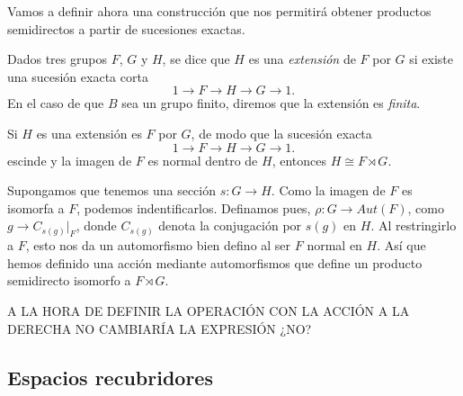 \documentclass[TFG.tex]{subfiles}
\begin{document}
Vamos a definir ahora una construcción que nos permitirá obtener productos semidirectos a partir de sucesiones exactas.

\begin{defi}
Dados tres grupos $F$, $G$ y $H$, se dice que $H$ es una \emph{extensión} de $F$ por $G$ si existe una sucesión exacta corta
\[
1\to F\to H\to G\to 1.
\]
En el caso de que $B$ sea un grupo finito, diremos que la extensión es \emph{finita}.
\end{defi} 

\begin{prop}\label{semidirect}
Si $H$ es una extensión es $F$ por $G$, de modo que la sucesión exacta 
\[
1\to F\to H\to G\to 1.
\]
escinde y la imagen de $F$ es normal dentro de $H$, entonces $H\cong F\rtimes G$. 
\end{prop}

\begin{dem}
Supongamos que tenemos una sección $s:G\to H$. Como la imagen de $F$ es isomorfa a $F$, podemos indentificarlos. Definamos pues, $\rho:G\to Aut(F)$, como $g\to C_{s(g)}|_F$, donde $C_{s(g)}$ denota la conjugación por $s(g)$ en $H$. Al restringirlo a $F$, esto nos da un automorfismo bien defino al ser $F$ normal en $H$. Así que hemos definido una acción mediante automorfismos que define un producto semidirecto isomorfo a $F\rtimes G$. 
\QED
\end{dem}
 

A LA HORA DE DEFINIR LA OPERACIÓN CON LA ACCIÓN A LA DERECHA NO CAMBIARÍA LA EXPRESIÓN ¿NO?

\subsection{Espacios recubridores}
\end{document}
